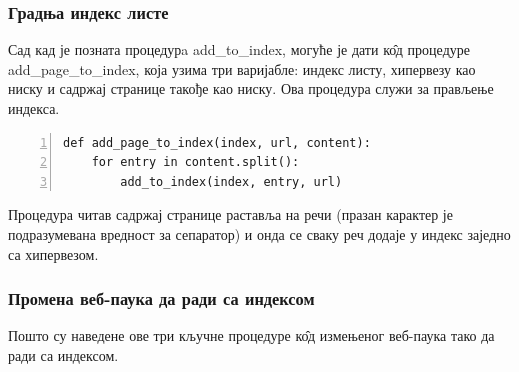 \documentclass[11pt, serbianc, english, titlepage]{article}
\begin{document}
		\subsubsection{Градња индекс листе}
		Сад кад је позната процедурa add\_to\_index, могуће је дати к\^{о}д процедуре add\_page\_to\_index, која узима три варијабле: индекс листу, хипервезу као ниску и садржај странице такође као ниску. Ова процедура служи за прављење индекса. 
		\begin{lstlisting}[caption=Процедура add\_page\_to\_index , label={lst:addpagetoindex}, numbers=left]
def add_page_to_index(index, url, content):
    for entry in content.split():
        add_to_index(index, entry, url)
		\end{lstlisting}
		Процедура читав садржај странице раставља на речи (празан карактер је подразумевана вредност за сепаратор) и онда се сваку реч додаје у индекс заједно са хипервезом. 
		\subsubsection{Промена веб-паука да ради са индексом}
		Пошто су наведене ове три кључне процедуре к\^{о}д измењеног веб-паука тако да ради са индексом. 
		
\end{document}
